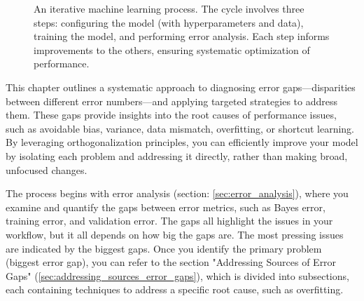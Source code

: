 \documentclass[12pt,openany, draft]{book}
\begin{document}
\begin{figure}[h!]
\centering
{}
\caption{An iterative machine learning process. The cycle involves three steps: configuring the model (with hyperparameters and data), training the model, and performing error analysis. Each step informs improvements to the others, ensuring systematic optimization of performance.}
\label{fig:ml_cycle}
\end{figure}

This chapter outlines a systematic approach to diagnosing error gaps—disparities between different error numbers—and applying targeted strategies to address them. These gaps provide insights into the root causes of performance issues, such as avoidable bias, variance, data mismatch, overfitting, or shortcut learning. By leveraging orthogonalization principles, you can efficiently improve your model by isolating each problem and addressing it directly, rather than making broad, unfocused changes. \newline

The process begins with error analysis (section: \ref{sec:error_analysis}), where you examine and quantify the gaps between error metrics, such as Bayes error, training error, and validation error. The gaps all highlight the issues in your workflow, but it all depends on how big the gaps are. The most pressing issues are indicated by the biggest gaps. Once you identify the primary problem (biggest error gap), you can refer to the section "Addressing Sources of Error Gaps" (\ref{sec:addressing_sources_error_gaps}), which is divided into subsections, each containing techniques to address a specific root cause, such as overfitting. \newline
\end{document}
